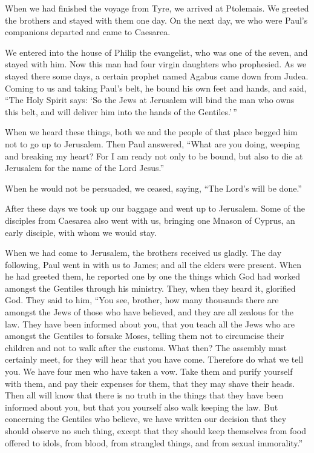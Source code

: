  When we had finished the voyage from Tyre, we arrived at
Ptolemais. We greeted the brothers and stayed with them one day.
 On the next day, we who were Paul's companions departed
and came to Caesarea.

We entered into the house of Philip the evangelist, who was one of the
seven, and stayed with him.  Now this man had four virgin
daughters who prophesied.  As we stayed there some days,
a certain prophet named Agabus came down from Judea. 
Coming to us and taking Paul's belt, he bound his own feet and hands,
and said, ``The Holy Spirit says: `So the Jews at Jerusalem will bind
the man who owns this belt, and will deliver him into the hands of the
Gentiles.'\,''

 When we heard these things, both we and the people of
that place begged him not to go up to Jerusalem.  Then
Paul answered, ``What are you doing, weeping and breaking my heart? For
I am ready not only to be bound, but also to die at Jerusalem for the
name of the Lord Jesus.''

 When he would not be persuaded, we ceased, saying, ``The
Lord's will be done.''

 After these days we took up our baggage and went up to
Jerusalem.  Some of the disciples from Caesarea also went
with us, bringing one Mnason of Cyprus, an early disciple, with whom we
would stay.

 When we had come to Jerusalem, the brothers received us
gladly.  The day following, Paul went in with us to
James; and all the elders were present.  When he had
greeted them, he reported one by one the things which God had worked
amongst the Gentiles through his ministry.  They, when
they heard it, glorified God. They said to him, ``You see, brother, how
many thousands there are amongst the Jews of those who have believed,
and they are all zealous for the law.  They have been
informed about you, that you teach all the Jews who are amongst the
Gentiles to forsake Moses, telling them not to circumcise their children
and not to walk after the customs.  What then? The
assembly must certainly meet, for they will hear that you have come.
 Therefore do what we tell you. We have four men who have
taken a vow.  Take them and purify yourself with them,
and pay their expenses for them, that they may shave their heads. Then
all will know that there is no truth in the things that they have been
informed about you, but that you yourself also walk keeping the law.
 But concerning the Gentiles who believe, we have written
our decision that they should observe no such thing, except that they
should keep themselves from food offered to idols, from blood, from
strangled things, and from sexual immorality.''

